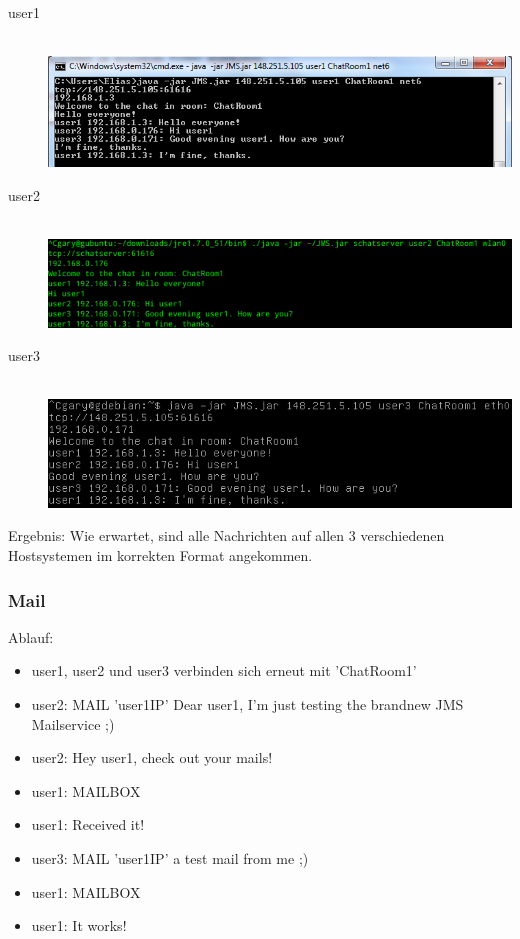 \documentclass[11pt, a4paper]{article}
\begin{document}
\begin{center}
  \begin{description}
    \item[user1] \hfill \\ \includegraphics[width=5in]{pic/chat_user1.png}
    \item[user2] \hfill \\ \includegraphics[width=5in]{pic/chat_user2.png}
    \item[user3] \hfill  \\ \includegraphics[width=5in]{pic/chat_user3.png}
  \end{description}
\end{center}

Ergebnis: Wie erwartet, sind alle Nachrichten auf allen 3 verschiedenen Hostsystemen im korrekten Format angekommen.

\newpage

\subsubsection{Mail}
Ablauf:
\begin{itemize}
	\item user1, user2 und user3 verbinden sich erneut mit 'ChatRoom1'
	\item user2: MAIL 'user1IP' Dear user1, I'm just testing the brandnew JMS Mailservice ;)
	\item user2: Hey user1, check out your mails!
	\item user1: MAILBOX
	\item user1: Received it!
	\item user3: MAIL 'user1IP' a test mail from me ;)
	\item user1: MAILBOX
	\item user1: It works!
\end{itemize}
\end{document}
